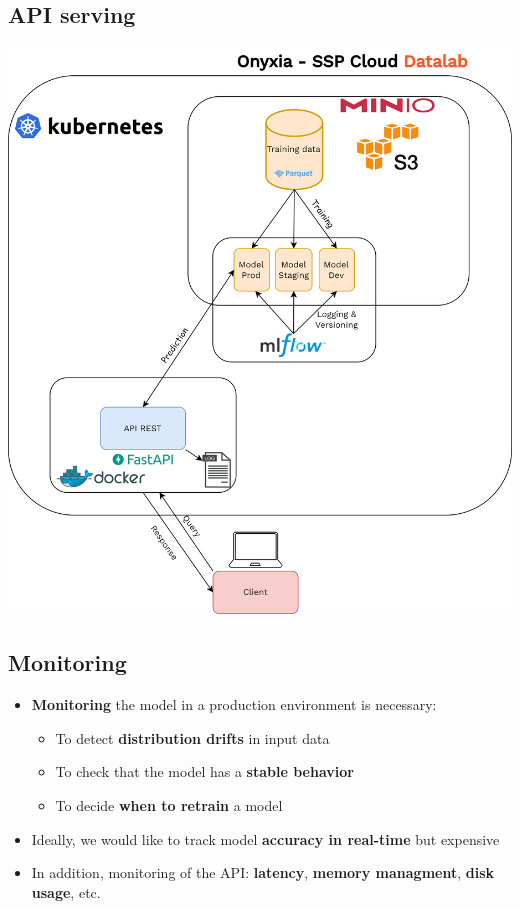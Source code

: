 \documentclass[
  letterpaper,
  DIV=11,
  numbers=noendperiod]{scrartcl}
\providecommand{\tightlist}{%
  \setlength{\itemsep}{0pt}\setlength{\parskip}{0pt}}\usepackage{longtable,booktabs,array}
\begin{document}
\subsection{API serving}\label{api-serving-1}

\begin{center}
\includegraphics{../img/api-datalab.png}
\end{center}

\subsection{Monitoring}\label{monitoring}

\begin{itemize}
\tightlist
\item
  {\textbf{Monitoring}} the model in a production environment is
  necessary:

  \begin{itemize}
  \tightlist
  \item
    To detect {\textbf{distribution drifts}} in input data
  \item
    To check that the model has a {\textbf{stable behavior}}
  \item
    To decide {\textbf{when to retrain}} a model
  \end{itemize}
\item
  Ideally, we would like to track model {\textbf{accuracy in real-time}}
  but expensive
\item
  In addition, monitoring of the API: {\textbf{latency}},
  {\textbf{memory managment}}, {\textbf{disk usage}}, etc.
\end{itemize}
\end{document}
